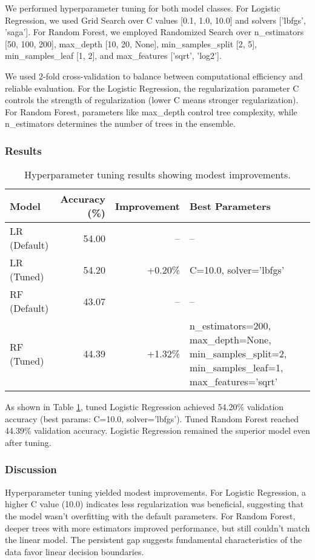 \documentclass[11pt]{article}
\begin{document}
We performed hyperparameter tuning for both model classes. For Logistic Regression, we used Grid Search over C values [0.1, 1.0, 10.0] and solvers ['lbfgs', 'saga']. For Random Forest, we employed Randomized Search over n\_estimators [50, 100, 200], max\_depth [10, 20, None], min\_samples\_split [2, 5], min\_samples\_leaf [1, 2], and max\_features ['sqrt', 'log2']. 

We used 2-fold cross-validation to balance between computational efficiency and reliable evaluation. For the Logistic Regression, the regularization parameter C controls the strength of regularization (lower C means stronger regularization). For Random Forest, parameters like max\_depth control tree complexity, while n\_estimators determines the number of trees in the ensemble.

\subsubsection{Results}

\begin{table}
\centering
\begin{tabularx}{\textwidth}{lrrX}
 \toprule
 Model & Accuracy (\%) & Improvement & Best Parameters \\
 \midrule
 LR (Default) & 54.00 & -- & -- \\
 LR (Tuned) & 54.20 & +0.20\% & C=10.0, solver='lbfgs' \\
 RF (Default) & 43.07 & -- & -- \\
 RF (Tuned) & 44.39 & +1.32\% & n\_estimators=200, max\_depth=None, min\_samples\_split=2, min\_samples\_leaf=1, max\_features='sqrt' \\
 \bottomrule
\end{tabularx}
\caption{\label{tab:tuning_results} Hyperparameter tuning results showing modest improvements.}
\end{table}

As shown in Table \ref{tab:tuning_results}, tuned Logistic Regression achieved 54.20\% validation accuracy (best params: C=10.0, solver='lbfgs'). Tuned Random Forest reached 44.39\% validation accuracy. Logistic Regression remained the superior model even after tuning.

\subsubsection{Discussion}

Hyperparameter tuning yielded modest improvements. For Logistic Regression, a higher C value (10.0) indicates less regularization was beneficial, suggesting that the model wasn't overfitting with the default parameters. For Random Forest, deeper trees with more estimators improved performance, but still couldn't match the linear model. The persistent gap suggests fundamental characteristics of the data favor linear decision boundaries.
\end{document}

